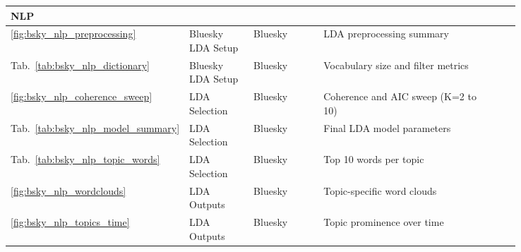 \begin{longtable}{|p{0.05\linewidth}|p{0.14\linewidth}|p{0.16\linewidth}|p{0.43\linewidth}|p{0.06\linewidth}|}
\multicolumn{5}{|l|}{\rule[-0.3em]{0pt}{1.2em}\textcolor{textprimary}{\sffamily\bfseries\small\enspace 4 \enspace NLP}} \\
\hline
\textcolor{textmuted}{\small\ref{fig:bsky_nlp_preprocessing}}      & \textcolor{textmuted}{\small Bluesky LDA Setup}   & \textcolor{textmuted}{\small Bluesky}         & \textcolor{textmuted}{\small LDA preprocessing summary}                & \textcolor{textmuted}{\small\pageref{fig:bsky_nlp_preprocessing}} \\\hline
\textcolor{textmuted}{\small Tab.~\ref{tab:bsky_nlp_dictionary}}   & \textcolor{textmuted}{\small Bluesky LDA Setup}   & \textcolor{textmuted}{\small Bluesky}         & \textcolor{textmuted}{\small Vocabulary size and filter metrics}       & \textcolor{textmuted}{\small\pageref{tab:bsky_nlp_dictionary}} \\\hline
\textcolor{textmuted}{\small\ref{fig:bsky_nlp_coherence_sweep}}    & \textcolor{textmuted}{\small LDA Selection}       & \textcolor{textmuted}{\small Bluesky}         & \textcolor{textmuted}{\small Coherence and AIC sweep (K=2 to 10)}      & \textcolor{textmuted}{\small\pageref{fig:bsky_nlp_coherence_sweep}} \\\hline
\textcolor{textmuted}{\small Tab.~\ref{tab:bsky_nlp_model_summary}}& \textcolor{textmuted}{\small LDA Selection}       & \textcolor{textmuted}{\small Bluesky}         & \textcolor{textmuted}{\small Final LDA model parameters}               & \textcolor{textmuted}{\small\pageref{tab:bsky_nlp_model_summary}} \\\hline
\textcolor{textmuted}{\small Tab.~\ref{tab:bsky_nlp_topic_words}}  & \textcolor{textmuted}{\small LDA Selection}       & \textcolor{textmuted}{\small Bluesky}         & \textcolor{textmuted}{\small Top 10 words per topic}                   & \textcolor{textmuted}{\small\pageref{tab:bsky_nlp_topic_words}} \\\hline
\textcolor{textmuted}{\small\ref{fig:bsky_nlp_wordclouds}}         & \textcolor{textmuted}{\small LDA Outputs}         & \textcolor{textmuted}{\small Bluesky}         & \textcolor{textmuted}{\small Topic-specific word clouds}               & \textcolor{textmuted}{\small\pageref{fig:bsky_nlp_wordclouds}} \\\hline
\textcolor{textmuted}{\small\ref{fig:bsky_nlp_topics_time}}        & \textcolor{textmuted}{\small LDA Outputs}         & \textcolor{textmuted}{\small Bluesky}         & \textcolor{textmuted}{\small Topic prominence over time}               & \textcolor{textmuted}{\small\pageref{fig:bsky_nlp_topics_time}} \\\hline

\end{longtable}
